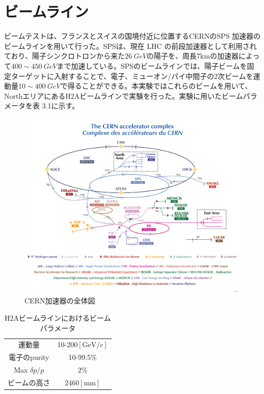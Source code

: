 \section{ビームライン}
ビームテストは、フランスとスイスの国境付近に位置するCERNのSPS 加速器のビームラインを用いて行った。SPSは、現在 LHC の前段加速器として利用されており、陽子シンクロトロンから来た$\SI{26}{GeV}$の陽子を、周長7kmの加速器によって$400\sim \SI{450}{GeV}$まで加速している。SPSのビームラインでは、陽子ビームを固定ターゲットに入射することで、電子、ミューオン/パイ中間子の2次ビームを運動量$10\sim \SI{400}{GeV}$で得ることができる。本実験ではこれらのビームを用いて、NorthエリアにあるH2Aビームラインで実験を行った。実験に用いたビームパラメータを表 3.1に示す。\\
\begin{figure}[H]
	\begin{center}
 \includegraphics[keepaspectratio, scale=0.7]
 	{Figure/Beamtest/cern.png}
 		\caption{CERN加速器の全体図}
	\end{center}
\end{figure}
\begin{table}[H]
 \centering
 \begin{tabular}{c c}
 \hline
運動量 & 10-200$[ \mathrm{GeV}/ c ]$\\
電子のpurity & 10-99.5\%\\
Max $\delta p / p$  & $2\%$\\
ビームの高さ & 2460$[ \mathrm{mm}]$\\
 \hline
 \end{tabular}
 \caption{H2Aビームラインにおけるビームパラメータ}
\end{table}

